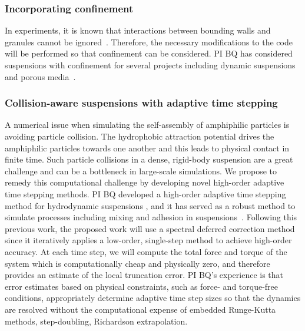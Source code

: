 %

\subsubsection{Incorporating confinement}
\label{subsec:Confinement}
In experiments, it is known that interactions between bounding walls and
granules cannot be ignored~\cite{qua-gan-you2021,
KaouiHartingMisbah2011_PRE, her-sto-gra2005}. Therefore, the necessary
modifications to the code will be performed so that confinement can be
considered. PI BQ has considered suspensions with confinement for
several projects including dynamic suspensions~\cite{qua-bir2014,
bys-sha-qua2020} and porous media~\cite{chi-moo-qua2020,
dea-qua-bir-jua2018, moo-che-chi-qua2022, qua-gan-you2021}.


\subsubsection{Collision-aware suspensions with adaptive time stepping}
\label{subsec:timeStepping}

A numerical issue when simulating the self-assembly of amphiphilic
particles is avoiding particle collision. The hydrophobic attraction
potential drives the amphiphilic particles towards one another and this
leads to physical contact in finite time. Such particle collisions in a
dense, rigid-body suspension are a great challenge and can be a
bottleneck in large-scale simulations. We propose to remedy this
computational challenge by developing novel high-order adaptive time
stepping methods. PI BQ developed a high-order adaptive time
stepping method for hydrodynamic suspensions \cite{qua-bir2016}, and it
has served as a robust method to simulate processes including mixing and
adhesion in suspensions~\cite{qua-vee-you2019, kab-qua-bir2017}.
Following this previous work, the proposed work will use a spectral
deferred correction method~\cite{dut-gre-rok2000} since it iteratively
applies a low-order, single-step method to achieve high-order accuracy.
At each time step, we will compute the total force and torque of the
system which is computationally cheap and physically zero, and therefore
provides an estimate of the local truncation error. PI BQ's experience
is that error estimates based on physical constraints, such as force-
and torque-free conditions, appropriately determine adaptive time step
sizes so that the dynamics are resolved without the computational
expense of embedded Runge-Kutta methods, step-doubling, Richardson
extrapolation.


